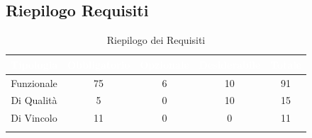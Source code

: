 \subsection{Riepilogo Requisiti}\label{Riepilogo}
\begin{center}
\begin{longtable}[c]{|c|c|c|c|c|}
\hline
\rowcolor{bluelogo}\textbf{\textcolor{white}{Tipologia}} & \textbf{\textcolor{white}{Obbligatorio}} & \textbf{\textcolor{white}{Opzionale}} & \textbf{\textcolor{white}{Desiderabile}} & \textbf{\textcolor{white}{Totale}}\\
\hline \hline
\endhead
Funzionale & 75 & 6 & 10 & 91\\
\hline
\rowcolor{grigio}Di Qualità & 5 & 0 & 10 & 15\\
\hline
Di Vincolo & 11 & 0 & 0 & 11\\
\hline
\caption{Riepilogo dei Requisiti}
\end{longtable}
\end{center}